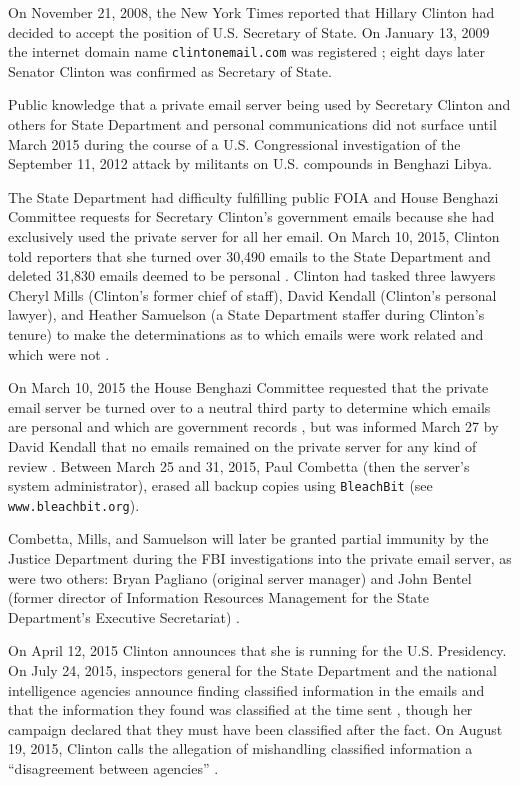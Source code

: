 \documentclass[journal]{vgtc}                %
\begin{document}
On November 21, 2008, the New York Times reported that Hillary Clinton had decided to accept the position of U.S. Secretary of State.  On January 13, 2009 the internet domain name \texttt{clintonemail.com} was registered \cite{whoisClintonserver}; eight days later Senator Clinton was confirmed as Secretary of State.  

Public knowledge that a private email server being used by Secretary Clinton and others for State Department and personal communications did not surface until March 2015 \cite{NewYorkTimes2015} during the course of a U.S. Congressional investigation \cite{BenghaziReport} of the September 11, 2012 attack by militants on U.S. compounds in Benghazi Libya.  

The State Department had difficulty fulfilling public FOIA and House Benghazi Committee requests \cite{TakingRootWashPost} for Secretary Clinton's government emails because she had exclusively used the private server for all her email.  On March 10, 2015,  Clinton told reporters that she turned over 30,490 emails to the State Department and deleted 31,830 emails deemed to be personal \cite{WashPostTimeline}.    Clinton had tasked three lawyers Cheryl Mills (Clinton's former chief of staff),  David Kendall (Clinton's personal lawyer), and Heather Samuelson (a State Department staffer during Clinton's tenure) to make the determinations as to which emails were work related and which were not \cite{emailVetting, thompsonTimeline}.   

On March 10, 2015 the House Benghazi Committee requested that the private email server be turned over to a neutral third party to determine which emails are personal and which are government records \cite{serverRequest}, but was informed March 27 by David Kendall that no emails remained on the private server for any kind of review \cite{serverScrubbedLawyer}.
Between March 25 and 31, 2015, Paul Combetta (then the server's system administrator), erased all backup copies using \texttt{BleachBit} (see \texttt{www.bleachbit.org}).    

Combetta, Mills, and Samuelson will later be granted partial immunity by the Justice Department during the FBI investigations into the private email server, as were two others: Bryan Pagliano (original server manager) and  John Bentel (former director of Information Resources Management for the State Department's Executive Secretariat) \cite{immunityPolitico, immunityDailyCaller, immunityIT}.  

On April 12, 2015 Clinton announces that she is running for the U.S. Presidency.  On July 24, 2015, inspectors general for the State Department  and the national intelligence agencies announce finding classified information in the emails and that the information they found was classified at the time sent \cite{serverClassified}, though her campaign declared that they must have been classified after the fact. On August 19, 2015, Clinton calls the allegation of mishandling classified information a ``disagreement between agencies'' \cite{clintonDenialGuardian}.
\end{document}

